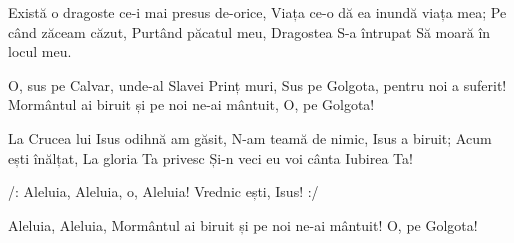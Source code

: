 \beginverse
Există o dragoste ce-i mai presus de-orice,
Viața ce-o dă ea inundă viața mea;
Pe când zăceam căzut,
Purtând păcatul meu,
Dragostea S-a întrupat
Să moară în locul meu.
\endverse

\beginchorus
O, sus pe Calvar, unde-al Slavei Prinț muri,
Sus pe Golgota, pentru noi a suferit!
Mormântul ai biruit și pe noi ne-ai mântuit,
O, pe Golgota!
\endchorus

\beginverse
La Crucea lui Isus odihnă am găsit,
N-am teamă de nimic,
Isus a biruit;
Acum ești înălțat,
La gloria Ta privesc
Și-n veci eu voi cânta Iubirea Ta!
\endverse

\beginchorus
/: Aleluia, Aleluia, o, Aleluia!
Vrednic ești, Isus! :/
\endchorus

\beginverse*
Aleluia, Aleluia,
Mormântul ai biruit și pe noi ne-ai mântuit!
O, pe Golgota!
\endverse
\endsong